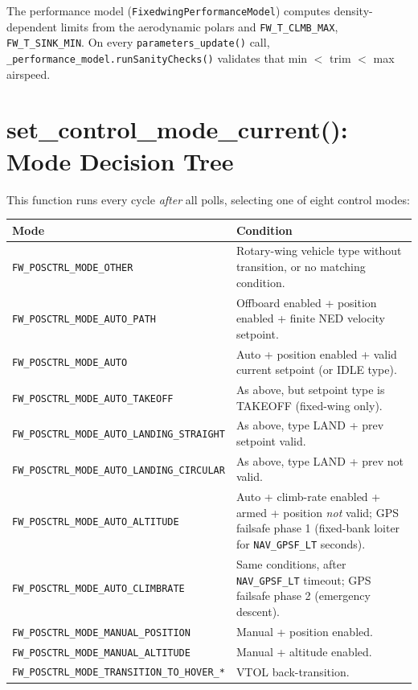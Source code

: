 \documentclass[12pt,a4paper]{article}
\begin{document}
The performance model (\texttt{FixedwingPerformanceModel}) computes
density-dependent limits from the aerodynamic polars and \texttt{FW\_T\_CLMB\_MAX},
\texttt{FW\_T\_SINK\_MIN}. On every \texttt{parameters\_update()} call,
\texttt{\_performance\_model.runSanityChecks()} validates that min $<$ trim
$<$ max airspeed.

\section{set\_control\_mode\_current(): Mode Decision Tree}
\label{sec:setmode}

This function runs every cycle \emph{after} all polls, selecting one of
eight control modes:

\begin{center}
\begin{tabular}{lp{8cm}}
\toprule
Mode & Condition \\
\midrule
\texttt{FW\_POSCTRL\_MODE\_OTHER} & Rotary-wing vehicle type without transition, or no matching condition. \\
\texttt{FW\_POSCTRL\_MODE\_AUTO\_PATH} & Offboard enabled + position enabled + finite NED velocity setpoint. \\
\texttt{FW\_POSCTRL\_MODE\_AUTO} & Auto + position enabled + valid current setpoint (or IDLE type). \\
\texttt{FW\_POSCTRL\_MODE\_AUTO\_TAKEOFF} & As above, but setpoint type is TAKEOFF (fixed-wing only). \\
\texttt{FW\_POSCTRL\_MODE\_AUTO\_LANDING\_STRAIGHT} & As above, type LAND + prev setpoint valid. \\
\texttt{FW\_POSCTRL\_MODE\_AUTO\_LANDING\_CIRCULAR} & As above, type LAND + prev not valid. \\
\texttt{FW\_POSCTRL\_MODE\_AUTO\_ALTITUDE} & Auto + climb-rate enabled + armed + position \emph{not} valid; GPS failsafe phase 1 (fixed-bank loiter for \texttt{NAV\_GPSF\_LT} seconds). \\
\texttt{FW\_POSCTRL\_MODE\_AUTO\_CLIMBRATE} & Same conditions, after \texttt{NAV\_GPSF\_LT} timeout; GPS failsafe phase 2 (emergency descent). \\
\texttt{FW\_POSCTRL\_MODE\_MANUAL\_POSITION} & Manual + position enabled. \\
\texttt{FW\_POSCTRL\_MODE\_MANUAL\_ALTITUDE} & Manual + altitude enabled. \\
\texttt{FW\_POSCTRL\_MODE\_TRANSITION\_TO\_HOVER\_*} & VTOL back-transition. \\
\bottomrule
\end{tabular}
\end{center}
\end{document}
